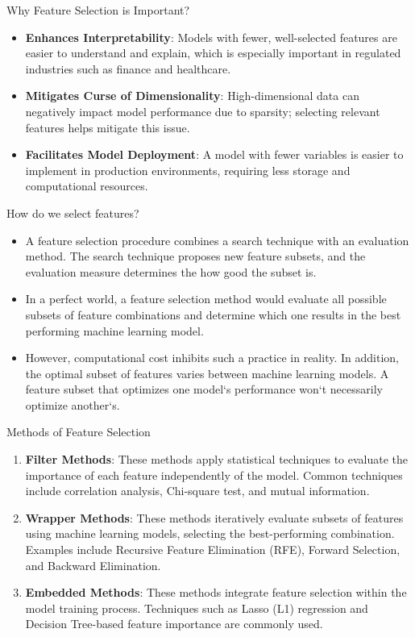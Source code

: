 \documentclass[11pt]{beamer}
\begin{document}
\begin{frame}{Why Feature Selection is Important?}
    \begin{itemize}
        \item \textbf{Enhances Interpretability}: Models with fewer, well-selected features are easier to understand and explain, which is especially important in regulated industries such as finance and healthcare.
        \item \textbf{Mitigates Curse of Dimensionality}: High-dimensional data can negatively impact model performance due to sparsity; selecting relevant features helps mitigate this issue.
        \item \textbf{Facilitates Model Deployment}: A model with fewer variables is easier to implement in production environments, requiring less storage and computational resources.
    \end{itemize}
\end{frame}
%
%
\begin{frame}{How do we select features? }
	\begin{itemize}
		\item A feature selection procedure combines a search technique with an evaluation method. The search technique proposes new feature subsets, and the evaluation measure determines the how good the subset is.
		\item In a perfect world, a feature selection method would evaluate all possible subsets of feature combinations and determine which one results in the best performing machine learning model.
		\item However, computational cost inhibits such a practice in reality. In addition, the optimal subset of features varies between machine learning models. A feature subset that optimizes one model`s performance won`t necessarily optimize another`s.
	\end{itemize}
\end{frame}
%
%
\begin{frame}{Methods of Feature Selection}
    \begin{enumerate}
        \item \textbf{Filter Methods}: These methods apply statistical techniques to evaluate the importance of each feature independently of the model. Common techniques include correlation analysis, Chi-square test, and mutual information.
        \item \textbf{Wrapper Methods}: These methods iteratively evaluate subsets of features using machine learning models, selecting the best-performing combination. Examples include Recursive Feature Elimination (RFE), Forward Selection, and Backward Elimination.
        \item \textbf{Embedded Methods}: These methods integrate feature selection within the model training process. Techniques such as Lasso (L1) regression and Decision Tree-based feature importance are commonly used.
    \end{enumerate}
\end{frame}
\end{document}
